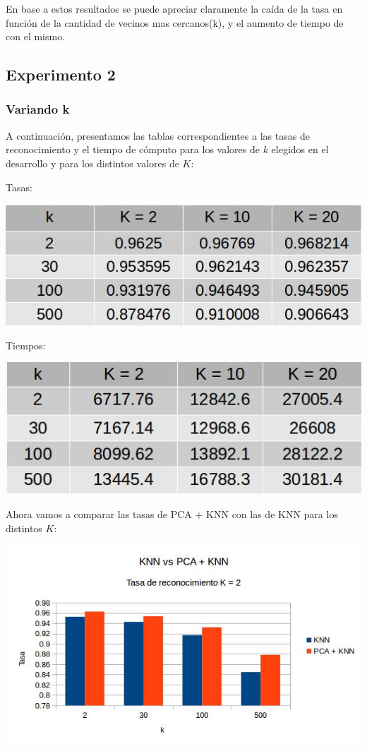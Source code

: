 En base a estos resultados se puede apreciar claramente la caída de la tasa en función de la cantidad de vecinos mas cercanos(k), y el aumento de tiempo de con el mismo.

\subsection{Experimento 2}
\subsubsection{Variando k}
A continuación, presentamos las tablas correspondientes a las tasas de reconocimiento y el tiempo de cómputo para los valores de $k$ elegidos en el desarrollo y para los distintos valores de $K$:
\newline
\newline
\centerline{Tasas:}
\newline
\centerline{
\includegraphics[scale=0.4]{Tablas/variandoktr.jpg}
}
\newline
\newline
\centerline{Tiempos:}
\newline
\centerline{
\includegraphics[scale=0.4]{Tablas/variandok.jpg}
}
\newline
\newline
Ahora vamos a comparar las tasas de PCA + KNN con las de KNN para los distintos $K$:
\newline
\newline
\centerline{
\includegraphics[scale=0.5]{Tablas/comtrK2.jpg}
}
